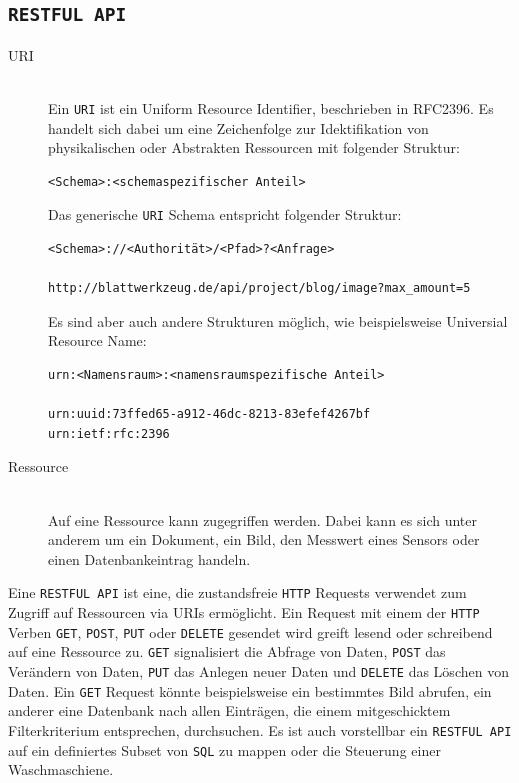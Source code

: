 \subsection{\texttt{RESTFUL API}}

\begin{description}
\item[URI] \mbox{}\\ Ein \texttt{URI} ist ein Uniform Resource Identifier,
  beschrieben in RFC2396\cite{rfc2396}. Es handelt sich dabei um eine Zeichenfolge zur
  Idektifikation von physikalischen oder Abstrakten Ressourcen mit folgender
  Struktur:
\begin{verbatim}
<Schema>:<schemaspezifischer Anteil>
\end{verbatim}
Das generische \texttt{URI} Schema entspricht folgender Struktur:
\begin{verbatim}
<Schema>://<Authorität>/<Pfad>?<Anfrage>

http://blattwerkzeug.de/api/project/blog/image?max_amount=5
\end{verbatim}
Es sind aber auch andere Strukturen möglich, wie beispielsweise Universial
Resource Name:
\begin{verbatim}
urn:<Namensraum>:<namensraumspezifische Anteil>

urn:uuid:73ffed65-a912-46dc-8213-83efef4267bf
urn:ietf:rfc:2396
\end{verbatim}
\item[Ressource] \mbox{}\\ Auf eine Ressource kann zugegriffen werden. Dabei
  kann es sich unter anderem um ein Dokument, ein Bild, den Messwert eines
  Sensors oder einen Datenbankeintrag handeln.
\end{description}

Eine \texttt{RESTFUL API} ist eine, die zustandsfreie \texttt{HTTP} Requests
verwendet zum Zugriff auf Ressourcen via URIs ermöglicht. Ein Request mit
einem der \texttt{HTTP} Verben \texttt{GET}, \texttt{POST}, \texttt{PUT} oder
\texttt{DELETE} gesendet wird greift lesend oder schreibend auf eine Ressource
zu. \texttt{GET} signalisiert die Abfrage von Daten, \texttt{POST} das Verändern
von Daten, \texttt{PUT} das Anlegen neuer Daten und \texttt{DELETE} das Löschen
von Daten. Ein \texttt{GET} Request könnte beispielsweise ein bestimmtes Bild
abrufen, ein anderer eine Datenbank nach allen Einträgen, die einem
mitgeschicktem Filterkriterium entsprechen, durchsuchen. Es ist auch vorstellbar
ein \texttt{RESTFUL API} auf ein definiertes Subset von \texttt{SQL} zu mappen
oder die Steuerung einer Waschmaschiene.


